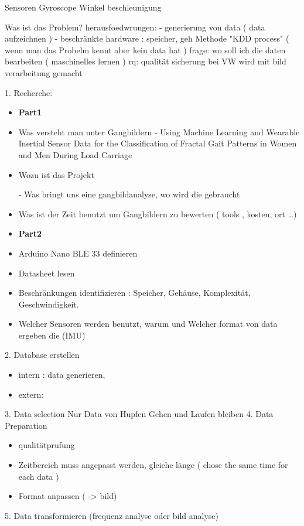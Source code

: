 Sensoren
Gyroscope Winkel beschleunigung

Was ist das Problem?  
herausfoedwrungen: 
- generierung von data ( data aufzeichnen )
- beschränkte hardware : speicher, geh
Methode "KDD process" ( wenn man das Probelm kennt aber kein data hat )
 frage: wo soll ich die daten bearbeiten ( maschinelles lernen )
 rq: qualität sicherung bei VW wird mit bild verarbeitung gemacht 

1. Recherche: 
\begin{itemize}
\item \textbf{Part1} 
\item Was versteht man unter Gangbildern 
	 	- Using Machine Learning and Wearable Inertial Sensor Data for the Classification of Fractal Gait Patterns in Women and Men During Load Carriage \cite{U.Ahamed2021}
\item Wozu ist das Projekt 
		
		- Was bringt uns eine gangbildanalyse, wo wird die gebraucht 
\item Was ist der Zeit benutzt um Gangbildern zu bewerten ( tools , kosten, ort  …) 
\item \textbf{Part2} 
\item Arduino Nano BLE 33 definieren 
	\item Datasheet lesen
	\item Beschränkungen identifizieren : Speicher, Gehäuse, Komplexität, Geschwindigkeit.  
	\item Welcher Sensoren werden benutzt, warum und Welcher format von data ergeben die (IMU)  
\end{itemize}
2. Database erstellen
\begin{itemize}
\item intern : data generieren, 
\item extern:  
\end{itemize}
3. Data selection 
	 Nur Data von Hupfen Gehen und Laufen bleiben  
4. Data Preparation 
\begin{itemize}
\item qualitätprufung
\item Zeitbereich muss angepasst werden, gleiche länge ( chose the same time for each data )
\item Format anpassen  ( -> bild)
\end{itemize}
5. Data transformieren (frequenz analyse oder bild analyse) 


